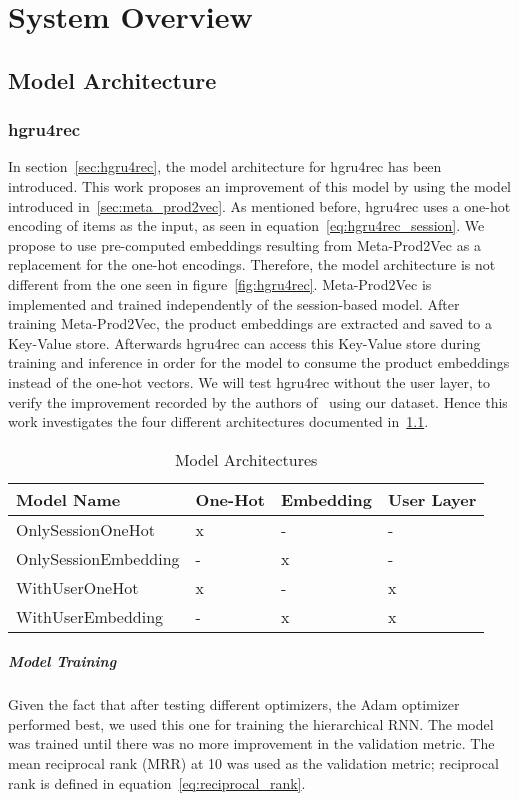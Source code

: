 \chapter{System Overview}

\section{Model Architecture}\label{sec:model_arch}
\subsection{hgru4rec}
In section~\ref{sec:hgru4rec}, the model architecture for hgru4rec has been introduced.
This work proposes an improvement of this model by using the model introduced in~\ref{sec:meta_prod2vec}.
As mentioned before, hgru4rec uses a one-hot encoding of items as the input, as seen in equation~\ref{eq:hgru4rec_session}.
We propose to use pre-computed embeddings resulting from Meta-Prod2Vec as a replacement for the one-hot encodings.
Therefore, the model architecture is not different from the one seen in figure~\ref{fig:hgru4rec}.
Meta-Prod2Vec is implemented and trained independently of the session-based model.
After training Meta-Prod2Vec, the product embeddings are extracted and saved to a Key-Value store.
Afterwards hgru4rec can access this Key-Value store during training and inference in order for the model to consume the product embeddings instead of the one-hot vectors.
We will test hgru4rec without the user layer, to verify the improvement recorded by the authors of~\cite{hierarchical} using our dataset.
Hence this work investigates the four different architectures documented in~\ref{tab:model_archs}.
\begin{table}[t]
    \centering
    \begin{tabular}{llll}\toprule
        \textbf{Model Name} & \textbf{One-Hot} & \textbf{Embedding} & \textbf{User Layer} \\ \midrule
        OnlySessionOneHot & x & - & - \\
        OnlySessionEmbedding & - & x & - \\
        WithUserOneHot & x & - & x \\
        WithUserEmbedding & - & x & x \\ \bottomrule
    \end{tabular}
    \caption{Model Architectures}
    \label{tab:model_archs}
\end{table}
\paragraph{Model Training}
Given the fact that after testing different optimizers, the Adam optimizer performed best, we used this one for training the hierarchical RNN.
The model was trained until there was no more improvement in the validation metric.
The mean reciprocal rank (MRR) at 10 was used as the validation metric; reciprocal rank is defined in equation~\ref{eq:reciprocal_rank}.

